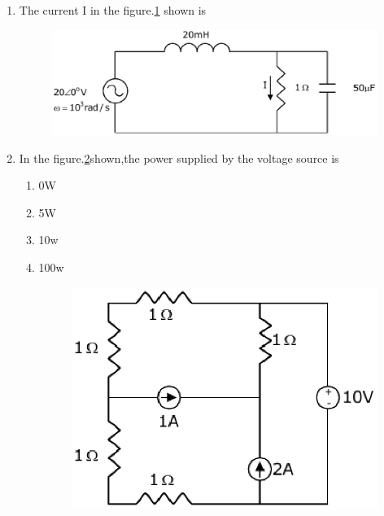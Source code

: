 \documentclass[journal,12pt,twocolumn]{IEEEtran}
\begin{document}
\begin{enumerate}
\item The current I in the figure.\ref{fig77} shown is
\begin{enumerate}
\setlength\itemsep{2em}
\begin{figure}[!h]
\begin{center}
\includegraphics[scale=0.5]{./figs/fig77.eps}
\caption{}
\label{fig77}
\end{center}
\end{figure}
\end{enumerate}

\item In the figure.\ref{fig78}shown,the power supplied by the voltage source is
\begin{enumerate}
\setlength\itemsep{2em}
\item 0W
\item 5W
\item 10w
\item 100w
\begin{figure}[!h]
\begin{center}
\includegraphics[scale=0.5]{./figs/fig78.eps}
\caption{}
\label{fig78}
\end{center}
\end{figure}
\end{enumerate}



\end{enumerate}
\end{document}
